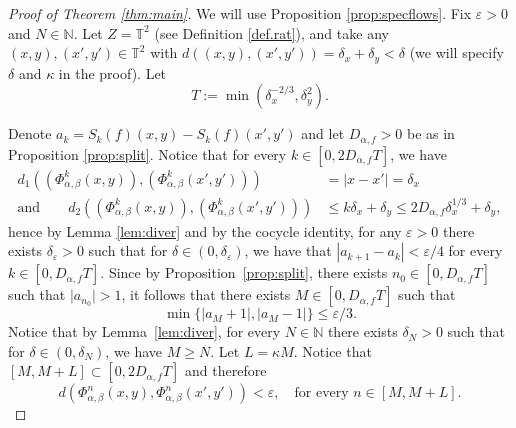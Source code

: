 \documentclass[JEP,XML,SOM,Unicode,NoEqCountersInSection]{cedram}
\let\epsilon\varepsilon
\theoremstyle{definition}
\theoremstyle{plain}
\newcommand\NN{\mathbb{N}}
\newcommand\TT{\mathbb{T}}
\begin{document}
\begin{proof}[Proof of Theorem \ref{thm:main}]
We will use Proposition \ref{prop:specflows}.
Fix $\epsilon>0$ and $N\in \NN$. Let $Z=\TT^2$ (see Definition \ref{def.rat}), and take any $(x,y),(x',y')\!\in\!\TT^2$ with
\hbox{$d((x,y),(x',y'))\!=\!\delta_x+\delta_y\!<\!\delta$} (we will specify $\delta$ and $\kappa$ in the proof). Let
\begin{equation}\label{def:time}
T:=\min(\delta_x^{-2/3},\delta_y^2).
\end{equation}

Denote $a_k=S_k(f)(x,y) - S_k(f)(x',y')$ and let $D_{\alpha,f}>0$ be as in Proposition \ref{prop:split}. Notice that
for every $k\in [0,2D_{\alpha,f}T]$, we have
\begin{equation}\label{eq:distn}
\begin{split}
d_1((\Phi_{\alpha,\beta}^k(x,y)),(\Phi_{\alpha,\beta}^k(x',y')))&=\vert x-x'\vert=
\delta_x\\
\text{and}\qquad
d_2((\Phi_{\alpha,\beta}^k(x,y)),(\Phi_{\alpha,\beta}^k(x',y')))&\leq k\delta_x+\delta_y\leq 2D_{\alpha,f}\delta_x^{1/3}+\delta_y,
\end{split}
\end{equation}
hence by Lemma \ref{lem:diver} and by the cocycle identity, for any $\epsilon>0$ there exists $\delta_\epsilon>0$ such
that for $\delta\in (0, \delta_\epsilon)$, we have that $|a_{k+1} -a_k| < \epsilon/4$ for every $k \in [0,D_{\alpha,f} T]$.
Since by Proposition~\ref{prop:split}, there exists
$n_0 \in [0,D_{\alpha,f}T]$ such that $\vert a_{n_0} \vert >1$, it follows that there exists $M\in [0,D_{\alpha,f}T]$ such that
\[
\min \{ |a_M + 1|, | a_M - 1|\} \leq \epsilon/3.
\]
Notice that by Lemma~\ref{lem:diver}, for every $N\in \NN$ there exists $\delta_N>0$ such that for $\delta\in (0,\delta_N)$, we have $M\geq N$.
Let $L=\kappa M$. Notice that $[M,M+L]\subset [0,2D_{\alpha,f}T]$ and therefore
\begin{equation}\label{eq:eps}
d(\Phi_{\alpha,\beta}^n(x,y),\Phi_{\alpha,\beta}^n(x',y'))<\epsilon, \quad\text{for every } n\in [M,M+L].
\end{equation}


\end{proof}
\end{document}
